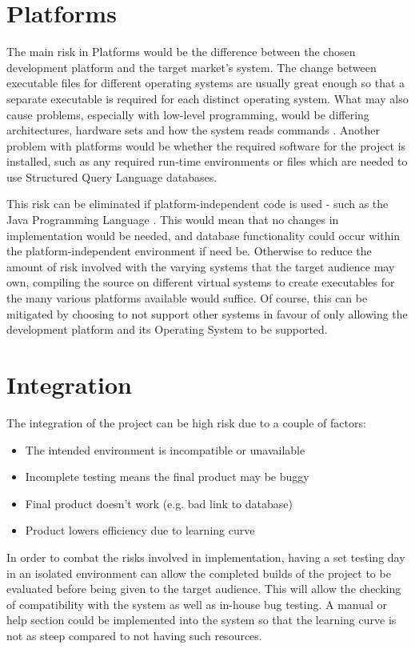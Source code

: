 \section{Platforms}
The main risk in Platforms would be the difference between the chosen development 
platform and the target market's system.  The change between executable files for 
different operating systems are usually great enough so that a separate 
executable is required for each distinct operating system. What may also cause 
problems, especially with low-level programming, would be differing 
architectures, hardware sets and how the system reads commands 
\cite{wikiArchDiff}. Another problem with platforms would be whether the required 
software for the project is installed, such as any required run-time environments 
or files which are needed to use Structured Query Language databases.

This risk can be eliminated if platform-independent code is used - such as the
Java Programming Language \cite{javaFeatures}. This would mean that no changes
in implementation would be needed, and database functionality could occur within
the platform-independent environment if need be. Otherwise to reduce the amount
of risk involved with the varying systems that the target audience may own,
compiling the source on different virtual systems to create executables for the
many various platforms available would suffice. Of course, this can be
mitigated by choosing to not support other systems in favour of only allowing
the development platform and its Operating System to be supported.

\section{Integration}
The integration of the project can be high risk due to a couple of factors:

\begin{itemize}
    \item The intended environment is incompatible or unavailable
    \item Incomplete testing means the final product may be buggy
    \item Final product doesn't work (e.g. bad link to database)
    \item Product lowers efficiency due to learning curve \cite{RiskList}
\end{itemize}

In order to combat the risks involved in implementation, having a set testing
day in an isolated environment can allow the completed builds of the project to
be evaluated before being given to the target audience. This will allow the
checking of compatibility with the system as well as in-house bug testing. A
manual or help section could be implemented into the system so that the learning
curve is not as steep compared to not having such resources.


